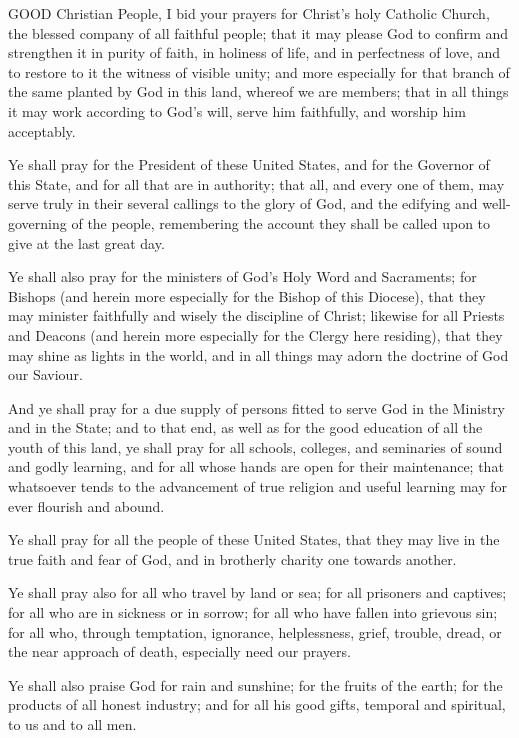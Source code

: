GOOD
Christian People, I bid your prayers for Christ’s holy Catholic
Church, the blessed company of all faithful people; that it may please
God to confirm and strengthen it in purity of faith, in holiness of life,
and in perfectness of love, and to restore to it the witness of visible
unity; and more especially for that branch of the same planted by God
in this land, whereof we are members; that in all things it may work according
to God’s will, serve him faithfully, and worship him acceptably.

Ye shall pray for the President of these United States,
and for the Governor of this State, and for all that are in authority;
that all, and every one of them, may serve truly in their several callings
to the glory of God, and the edifying and well-governing of the people,
remembering the account they shall be called upon to give at the last
great day.

Ye shall also pray for the ministers of God’s
Holy Word and Sacraments; for Bishops (and herein more especially for
the Bishop of this Diocese), that they may minister faithfully and wisely
the discipline of Christ; likewise for all Priests and Deacons (and herein
more especially for the Clergy here residing), that they may shine as
lights in the world, and in all things may adorn the doctrine of God our
Saviour.

And ye shall pray for a due supply of persons fitted
to serve God in the Ministry and in the State; and to that end, as well
as for the good education of all the youth of this land, ye shall pray
for all schools, colleges, and seminaries of sound and godly learning,
and for all whose hands are open for their maintenance; that whatsoever
tends to the advancement of true religion and useful learning may for
ever flourish and abound.

Ye shall pray for all the people of these United States,
that they may live in the true faith and fear of God, and in brotherly
charity one towards another.

Ye shall pray also for all who travel by land or sea;
for all prisoners and captives; for all who are in sickness or in sorrow;
for all who have fallen into grievous sin; for all who, through temptation,
ignorance, helplessness, grief, trouble, dread, or the near approach of
death, especially need our prayers.

Ye shall also praise God for rain and sunshine; for
the fruits of the earth; for the products of all honest industry; and
for all his good gifts, temporal and spiritual, to us and to all men.

